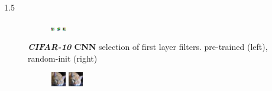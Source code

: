 \documentclass[final]{beamer}
\newlength{\onecolwid}
\newlength{\threecolwid}
\begin{document}
\begin{frame}[t]
\begin{columns}[t]
\begin{column}{\threecolwid}
\begin{alertblock}
\begin{columns}[t]
\begin{column}{1.5\onecolwid}
\begin{figure}
\begin{subfigure}{.4\linewidth}
					\includegraphics[width=0.1\linewidth]{graphics/cifar_filters/random_16.png} %
					\includegraphics[width=0.1\linewidth]{graphics/cifar_filters/random_17.png} %
					\includegraphics[width=0.1\linewidth]{graphics/cifar_filters/random_18.png}
				\end{subfigure}

			\caption{\textbf{\emph{CIFAR-10} CNN} selection of first layer filters. pre-trained (left), random-init (right)}
			\label{fig:cifar_filters}

			\end{figure}

			\begin{figure}

				\begin{subfigure}{0.4\linewidth}

					\centering
					\includegraphics[width=0.4\linewidth]{graphics/reconstructions/cifar/relu/input_00_relu.png}
					\includegraphics[width=0.4\linewidth]{graphics/reconstructions/cifar/relu/reconstruction_00_relu.png}


\end{subfigure}
\end{figure}
\end{column}
\end{columns}
\end{alertblock}
\end{column}
\end{columns}
\end{frame}
\end{document}
